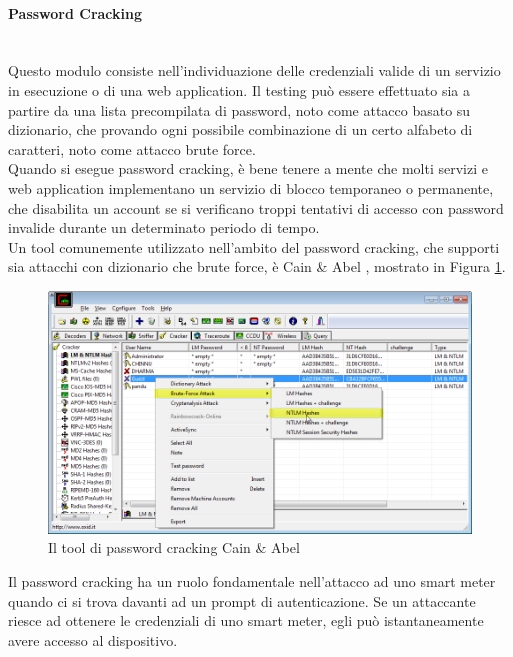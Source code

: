 \paragraph{Password Cracking}\mbox{}\\
Questo modulo consiste nell'individuazione delle credenziali valide di un servizio in esecuzione o di una web application. Il testing può essere effettuato sia a partire da una lista precompilata di password, noto come attacco basato su dizionario, che provando ogni possibile combinazione di un certo alfabeto di caratteri, noto come attacco brute force.\\
Quando si esegue password cracking, è bene tenere a mente che molti servizi e web application implementano un servizio di blocco temporaneo o permanente, che disabilita un account se si verificano troppi tentativi di accesso con password invalide durante un determinato periodo di tempo.\\
Un tool comunemente utilizzato nell'ambito del password cracking, che supporti sia attacchi con dizionario che brute force, è Cain \& Abel \cite{cainabel}, mostrato in Figura \ref{cainabel_img}.\\
\begin{figure}[hbtp]
	\centering
	\includegraphics[scale=.3]{imgs/attack/cainabel.png}
	\caption{Il tool di password cracking Cain \& Abel}
	\label{cainabel_img}
\end{figure}
Il password cracking ha un ruolo fondamentale nell'attacco ad uno smart meter quando ci si trova davanti ad un prompt di autenticazione. Se un attaccante riesce ad ottenere le credenziali di uno smart meter, egli può istantaneamente avere accesso al dispositivo.

